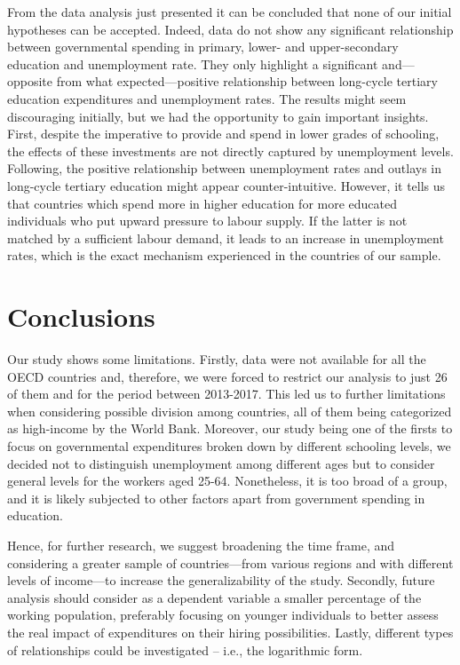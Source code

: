 \documentclass[
]{article}
\begin{document}
From the data analysis just presented it can be concluded that none of
our initial hypotheses can be accepted. Indeed, data do not show any
significant relationship between governmental spending in primary,
lower- and upper-secondary education and unemployment rate. They only
highlight a significant and---opposite from what expected---positive
relationship between long-cycle tertiary education expenditures and
unemployment rates. The results might seem discouraging initially, but
we had the opportunity to gain important insights. First, despite the
imperative to provide and spend in lower grades of schooling, the
effects of these investments are not directly captured by unemployment
levels. Following, the positive relationship between unemployment rates
and outlays in long-cycle tertiary education might appear
counter-intuitive. However, it tells us that countries which spend more
in higher education for more educated individuals who put upward
pressure to labour supply. If the latter is not matched by a sufficient
labour demand, it leads to an increase in unemployment rates, which is
the exact mechanism experienced in the countries of our sample.

\hypertarget{conclusions}{%
\section{Conclusions}\label{conclusions}}

Our study shows some limitations. Firstly, data were not available for
all the OECD countries and, therefore, we were forced to restrict our
analysis to just 26 of them and for the period between 2013-2017. This
led us to further limitations when considering possible division among
countries, all of them being categorized as high-income by the World
Bank. Moreover, our study being one of the firsts to focus on
governmental expenditures broken down by different schooling levels, we
decided not to distinguish unemployment among different ages but to
consider general levels for the workers aged 25-64. Nonetheless, it is
too broad of a group, and it is likely subjected to other factors apart
from government spending in education.

Hence, for further research, we suggest broadening the time frame, and
considering a greater sample of countries---from various regions and
with different levels of income---to increase the generalizability of
the study. Secondly, future analysis should consider as a dependent
variable a smaller percentage of the working population, preferably
focusing on younger individuals to better assess the real impact of
expenditures on their hiring possibilities. Lastly, different types of
relationships could be investigated -- i.e., the logarithmic form.
\end{document}

